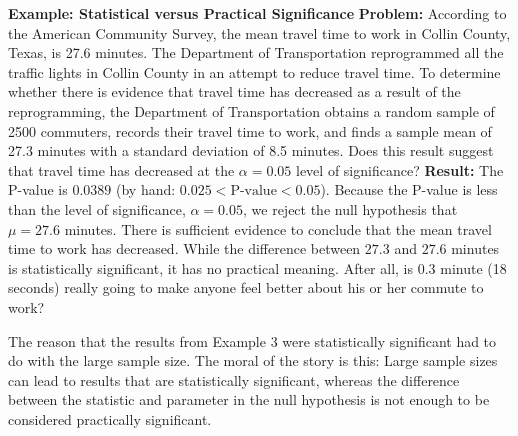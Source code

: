 \documentclass{report}
\begin{document}
    \bigbreak \noindent 
    \begin{mdframed}
      \textbf{Example: Statistical versus Practical Significance}
      \bigbreak \noindent 
      \textbf{Problem:}
      According to the American Community Survey, the mean travel time to work in Collin County, Texas, is 27.6 minutes. The Department of Transportation reprogrammed all the traffic lights in Collin County in an attempt to reduce travel time. To determine whether there is evidence that travel time has decreased as a result of the reprogramming, the Department of Transportation obtains a random sample of 2500 commuters, records their travel time to work, and finds a sample mean of 27.3 minutes with a standard deviation of 8.5 minutes. Does this result suggest that travel time has decreased at the $\alpha=0.05$ level of significance?
      \bigbreak \noindent 
      \textbf{Result:}
      \bigbreak \noindent 
      The P-value is $0.0389$ (by hand: $0.025 < \text{P-value} < 0.05$). Because the P-value is less than the level of significance, $\alpha=0.05$, we reject the null hypothesis that $\mu=27.6$ minutes. There is sufficient evidence to conclude that the mean travel time to work has decreased. While the difference between $27.3$ and $27.6$ minutes is statistically significant, it has no practical meaning. After all, is $0.3$ minute (18 seconds) really going to make anyone feel better about his or her commute to work?

      
    \end{mdframed}
    \bigbreak \noindent 
    The reason that the results from Example 3 were statistically significant had to do with the large sample size. The moral of the story is this:
    \bigbreak \noindent 
    Large sample sizes can lead to results that are statistically significant, whereas the difference between the statistic and parameter in the null hypothesis is not enough to be considered practically significant.

    \pagebreak 
\end{document}
